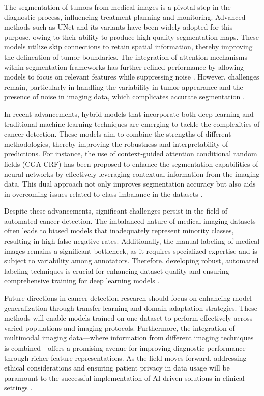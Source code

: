 \documentclass[runningheads]{llncs}
\begin{document}
The segmentation of tumors from medical images is a pivotal step in the diagnostic process, influencing treatment planning and monitoring. Advanced methods such as UNet and its variants have been widely adopted for this purpose, owing to their ability to produce high-quality segmentation maps. These models utilize skip connections to retain spatial information, thereby improving the delineation of tumor boundaries. The integration of attention mechanisms within segmentation frameworks has further refined performance by allowing models to focus on relevant features while suppressing noise \cite{Longfeng_2023}. However, challenges remain, particularly in handling the variability in tumor appearance and the presence of noise in imaging data, which complicates accurate segmentation \cite{Istiak_2024}.

In recent advancements, hybrid models that incorporate both deep learning and traditional machine learning techniques are emerging to tackle the complexities of cancer detection. These models aim to combine the strengths of different methodologies, thereby improving the robustness and interpretability of predictions. For instance, the use of context-guided attention conditional random fields (CGA-CRF) has been proposed to enhance the segmentation capabilities of neural networks by effectively leveraging contextual information from the imaging data. This dual approach not only improves segmentation accuracy but also aids in overcoming issues related to class imbalance in the datasets \cite{Longfeng_2023}.

Despite these advancements, significant challenges persist in the field of automated cancer detection. The imbalanced nature of medical imaging datasets often leads to biased models that inadequately represent minority classes, resulting in high false negative rates. Additionally, the manual labeling of medical images remains a significant bottleneck, as it requires specialized expertise and is subject to variability among annotators. Therefore, developing robust, automated labeling techniques is crucial for enhancing dataset quality and ensuring comprehensive training for deep learning models \cite{Istiak_2024}.

Future directions in cancer detection research should focus on enhancing model generalization through transfer learning and domain adaptation strategies. These methods will enable models trained on one dataset to perform effectively across varied populations and imaging protocols. Furthermore, the integration of multimodal imaging data—where information from different imaging techniques is combined—offers a promising avenue for improving diagnostic performance through richer feature representations. As the field moves forward, addressing ethical considerations and ensuring patient privacy in data usage will be paramount to the successful implementation of AI-driven solutions in clinical settings \cite{Istiak_2024}.
\end{document}
